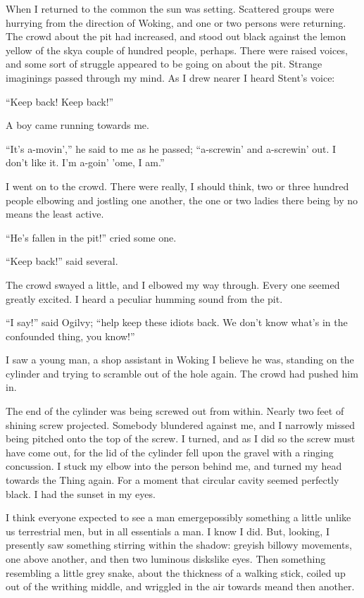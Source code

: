 When I returned to the common the sun was setting. Scattered groups
were hurrying from the direction of Woking, and one or two persons
were returning. The crowd about the pit had increased, and stood
out black against the lemon yellow of the sky\dash{}a couple of hundred
people, perhaps. There were raised voices, and some sort of
struggle appeared to be going on about the pit. Strange imaginings
passed through my mind. As I drew nearer I heard Stent's voice:

``Keep back! Keep back!''

A boy came running towards me.

``It's a-movin','' he said to me as he passed; ``a-screwin' and
a-screwin' out. I don't like it. I'm a-goin' 'ome, I am.''

I went on to the crowd. There were really, I should think, two or
three hundred people elbowing and jostling one another, the one or
two ladies there being by no means the least active.

``He's fallen in the pit!'' cried some one.

``Keep back!'' said several.

The crowd swayed a little, and I elbowed my way through. Every one
seemed greatly excited. I heard a peculiar humming sound from the
pit.

``I say!'' said Ogilvy; ``help keep these idiots back. We don't know
what's in the confounded thing, you know!''

I saw a young man, a shop assistant in Woking I believe he was,
standing on the cylinder and trying to scramble out of the hole
again. The crowd had pushed him in.

The end of the cylinder was being screwed out from within. Nearly
two feet of shining screw projected. Somebody blundered against me,
and I narrowly missed being pitched onto the top of the screw. I
turned, and as I did so the screw must have come out, for the lid
of the cylinder fell upon the gravel with a ringing concussion. I
stuck my elbow into the person behind me, and turned my head
towards the Thing again. For a moment that circular cavity seemed
perfectly black. I had the sunset in my eyes.

I think everyone expected to see a man emerge\dash{}possibly something a
little unlike us terrestrial men, but in all essentials a man. I
know I did. But, looking, I presently saw something stirring within
the shadow: greyish billowy movements, one above another, and then
two luminous disks\dash{}like eyes. Then something resembling a little
grey snake, about the thickness of a walking stick, coiled up out
of the writhing middle, and wriggled in the air towards me\dash{}and
then another.

